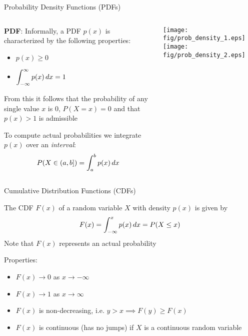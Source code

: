 {    \begin{frame}{Probability Density Functions (PDFs)}
        \begin{columns}[onlytextwidth]
            \begin{column}{0.55\textwidth}
                \begin{boxed}
                    \textbf{PDF}:
                    Informally, a PDF $p(x)$ is characterized by the following properties:
                    \begin{itemize}
                        \item ${\displaystyle p(x) \geq 0 }$
                        \item ${\displaystyle \int_{-\infty}^{\infty} p(x)  \mathop{dx} = 1 }$
                    \end{itemize}
                    From this it follows that the probability of any single value $x$
                    is $0$, $P(X = x) = 0$ and that $p(x) > 1$ is admissible
                \end{boxed}

                To compute actual probabilities we integrate $p(x)$ over an \emph{interval}:
                $$P(X\in(a, b]) = \int _ {a}^{b} p(x) \mathop{dx}$$
            \end{column}
            \begin{column}{0.45\textwidth}
                \centering
                \texttt{[image: fig/prob\_density\_1.eps]}
                \hspace*{2mm}\texttt{[image: fig/prob\_density\_2.eps]}
            \end{column}
        \end{columns}
    \end{frame}

    \begin{frame}{Cumulative Distribution Functions (CDFs)}
        \begin{boxed}
            The CDF $F(x)$ of a random variable $X$ with density $p(x)$ is given by
            $$F(x) = \int _ {-\infty}^{x} p(x) \mathop{dx} = P(X \le x)$$
            Note that $F(x)$ represents an actual probability
        \end{boxed}

        Properties:
        \begin{itemize}
            \item $F(x) \rightarrow 0$ as $x\rightarrow -\infty$
            \item $F(x) \rightarrow 1$ as $x\rightarrow \infty$
            \item $F(x)$ is non-decreasing, i.e. $y > x \implies F(y) \ge F(x)$
            \item $F(x)$ is continuous (has no jumps) if $X$ is a continuous random variable
        \end{itemize}
    \end{frame}

}
